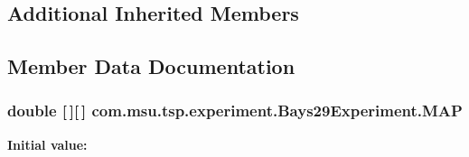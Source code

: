 \subsection*{Additional Inherited Members}


\subsection{Member Data Documentation}
\hypertarget{classcom_1_1msu_1_1tsp_1_1experiment_1_1Bays29Experiment_a8add5b3b067a46f8159ac14683ad9930}{
\subsubsection[{M\-A\-P}]{\setlength{\rightskip}{0pt plus 5cm}double \mbox{[}$\,$\mbox{]}\mbox{[}$\,$\mbox{]} com.\-msu.\-tsp.\-experiment.\-Bays29\-Experiment.\-M\-A\-P\hspace{0.3cm}{\ttfamily [static]}}}\label{classcom_1_1msu_1_1tsp_1_1experiment_1_1Bays29Experiment_a8add5b3b067a46f8159ac14683ad9930}
{\bfseries Initial value\-:}

